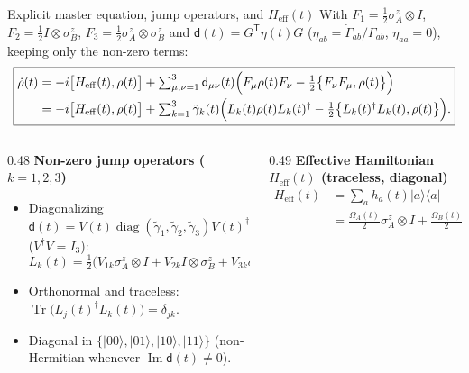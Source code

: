 \documentclass[aspectratio=169,11pt]{beamer}
\newcommand{\ket}[1]{\lvert #1\rangle}
\newcommand{\bra}[1]{\langle #1\rvert}
\newcommand{\Tr}{\operatorname{Tr}}
\newcommand{\diag}{\operatorname{diag}}
\newcommand{\dmat}{\mathsf d}
\newcommand{\Heff}{H_{\mathrm{eff}}}
\begin{document}
\begin{frame}{Explicit master equation, jump operators, and \texorpdfstring{$\Heff(t)$}{H\_eff(t)}}
\footnotesize\setlength\abovedisplayskip{3pt}\setlength\belowdisplayskip{3pt}
With $F_1=\tfrac12\sigma_A^z\otimes I$, $F_2=\tfrac12I\otimes\sigma_B^z$, $F_3=\tfrac12\sigma_A^z\otimes\sigma_B^z$ and $\dmat(t)=G^{\mathsf T}\eta(t)G$ ($\eta_{ab}=\dot\Gamma_{ab}/\Gamma_{ab}$, $\eta_{aa}=0$), keeping only the non-zero terms:
\[
\boxed{\begin{aligned}
\dot\rho(t)&=-i\bigl[\Heff(t),\rho(t)\bigr]+\textstyle\sum_{\mu,\nu=1}^{3}\dmat_{\mu\nu}(t)\Bigl(F_\mu\rho(t)F_\nu-\tfrac12\bigl\{F_\nu F_\mu,\rho(t)\bigr\}\Bigr)\\[-1pt]
&=-i\bigl[\Heff(t),\rho(t)\bigr]+\textstyle\sum_{k=1}^{3}\tilde\gamma_k(t)\Bigl(L_k(t)\rho(t)L_k(t)^\dagger-\tfrac12\bigl\{L_k(t)^\dagger L_k(t),\rho(t)\bigr\}\Bigr).
\end{aligned}}
\]
\begin{columns}[T,totalwidth=\textwidth]
\begin{column}{0.48\textwidth}
\textbf{Non-zero jump operators ($k=1,2,3$)}
\begin{itemize}\scriptsize\setlength\abovedisplayskip{3pt}\setlength\belowdisplayskip{3pt}\setlength\itemsep{3pt}
\item Diagonalizing $\dmat(t)=V(t)\diag(\tilde\gamma_1,\tilde\gamma_2,\tilde\gamma_3)V(t)^\dagger$ ($V^\dagger V=I_3$):
\[
L_k(t)=\tfrac12\bigl(V_{1k}\sigma_A^z\otimes I+V_{2k}I\otimes\sigma_B^z+V_{3k}\sigma_A^z\otimes\sigma_B^z\bigr).
\]
\item Orthonormal and traceless: $\Tr\bigl(L_j(t)^\dagger L_k(t)\bigr)=\delta_{jk}$.
\item Diagonal in $\{\ket{00},\ket{01},\ket{10},\ket{11}\}$ (non-Hermitian whenever $\operatorname{Im}\dmat(t)\neq0$).
\end{itemize}
\end{column}
\begin{column}{0.49\textwidth}
\textbf{Effective Hamiltonian $\Heff(t)$ (traceless, diagonal)}
{\scriptsize\setlength\abovedisplayskip{3pt}\setlength\belowdisplayskip{3pt}
\[
\begin{aligned}
\Heff(t)&=\textstyle\sum_{a}h_a(t)\ket a\bra a\\[-2pt]
&=\tfrac{\Omega_A(t)}{2}\sigma_A^z\otimes I+\tfrac{\Omega_B(t)}{2}I\otimes\sigma_B^z+\tfrac{J_{zz}(t)}{2}\sigma_A^z\otimes\sigma_B^z
\end{aligned}
\]}
\end{column}
\end{columns}
\end{frame}
\end{document}
